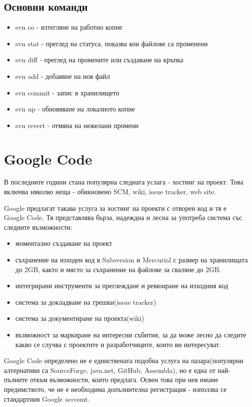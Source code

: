 \subsection{Основни команди}

\begin{itemize}
\item svn co - изтегляне на работно копие
\item svn stat - преглед на статуса, показва кои файлове са променени
\item svn diff - преглед на промените или създаване на кръпка
\item svn add - добавяне на нов файл
\item svn commit - запис в хранилището
\item svn up - обновяване на локалното копие
\item svn revert - отмяна на нежелани промени  
\end{itemize}

\section{Google Code}
В последните години стана популярна следната услага - хостинг на
проект. Това включва няколко неща - обикновено SCM, wiki, issue tracker, web
site.

Google предлагат такава услуга за хостинг на проекти с отворен код и
тя е Google Code. Тя представлява бърза, надеждна и лесна за употреба
система със следните възможности:


\begin{itemize}
  \item моментално създаване на проект
  \item съхранение на изходен код в Subversion и Mercurial с размер на
    хранилищата до 2GB, както и място за съхранение на файлове за
    сваляне до 2GB.
  \item интегрирани инструменти за преглеждане и ревюиране на изходния
    код
  \item система за докладване на грешки(issue tracker)
  \item система за документиране на проекта(wiki)
  \item възможност за маркиране на интересни събития, за да може лесно
    да следите какво се случва с проектите и разработчиците, които ви
    интересуват. 
\end{itemize}

Google Code определено не е единствената подобна услуга на
пазара(популярни алтернативи са SourceForge, java.net, GitHub,
Assembla), но е една от най-пълните откъм възможности, които
предлага. Освен това при нея имаме предимството, че не е необходима
допълнителна регистрация - използва се стандартния Google account.

